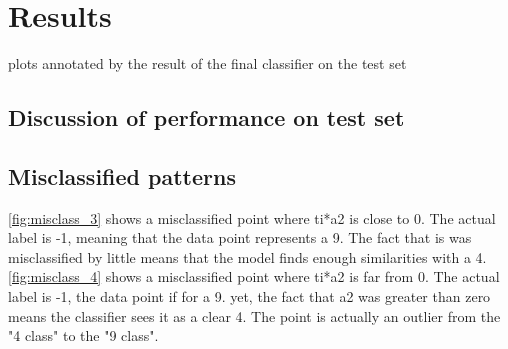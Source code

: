 \section{Results}
	plots annotated by the result of the final classifier on the test set
	\subsection{Discussion of performance on test set}

	\subsection{Misclassified patterns}
	\ref{fig:misclass_3} shows a misclassified point where ti*a2 is close to 0.
The actual label is -1, meaning that the data point represents a 9. The fact that is was misclassified by little  means that the model finds enough similarities with a 4. \ref{fig:misclass_4} shows a misclassified point where ti*a2 is far from 0.
The actual label is -1, the data point if for a 9. yet, the fact that a2 was greater than zero means the classifier sees it as a clear 4.
The point is actually an outlier from the "4 class" to the "9 class".
